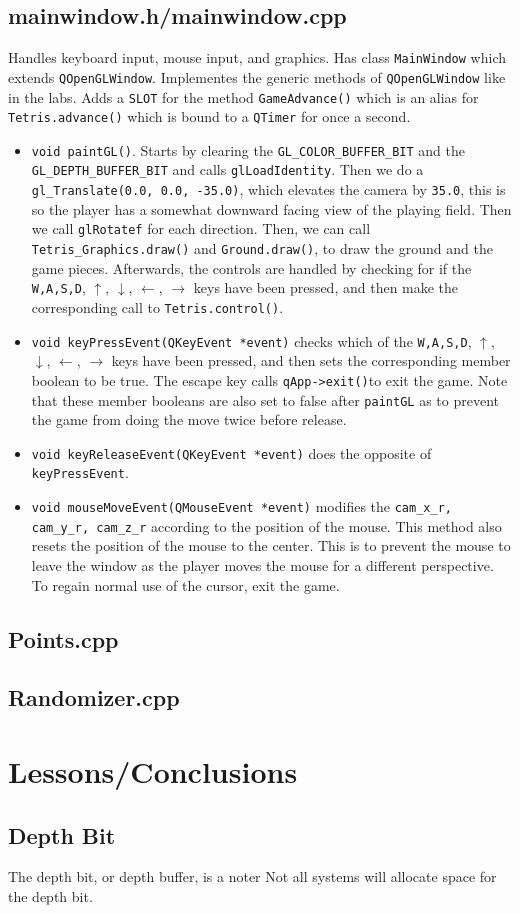 \documentclass[letterpaper, 12pt]{article}
\begin{document}
\subsection{mainwindow.h/mainwindow.cpp}
Handles keyboard input, mouse input, and graphics.
Has class \verb|MainWindow| which extends \verb|QOpenGLWindow|.
Implementes the generic methods of \verb|QOpenGLWindow| like in the labs.
Adds a \verb|SLOT| for the method \verb|GameAdvance()| which is an alias for \verb|Tetris.advance()| which is bound to a \verb|QTimer| for once a second.
\begin{itemize}
    \item \verb|void paintGL()|.
        Starts by clearing the \verb|GL_COLOR_BUFFER_BIT| and the \verb|GL_DEPTH_BUFFER_BIT| and calls \verb|glLoadIdentity|.
        Then we do a \verb|gl_Translate(0.0, 0.0, -35.0)|, which elevates the camera by \verb|35.0|, this is so the player has a somewhat downward facing view of the playing field.
        Then we call \verb|glRotatef| for each direction.
        Then, we can call \verb|Tetris_Graphics.draw()| and \verb|Ground.draw()|, to draw the ground and the game pieces.
        Afterwards, the controls are handled by checking for if the \verb|W,A,S,D|, $\uparrow$, $\downarrow$, $\leftarrow$, $\rightarrow$ keys have been pressed, and then make the corresponding call to \verb|Tetris.control()|.
    \item \verb|void keyPressEvent(QKeyEvent *event)| checks which of the \verb|W,A,S,D|, $\uparrow$, $\downarrow$, $\leftarrow$, $\rightarrow$ keys have been pressed, and then sets the corresponding member boolean to be true.
        The escape key calls \verb|qApp->exit()|to exit the game.
        Note that these member booleans are also set to false after \verb|paintGL| as to prevent the game from doing the move twice before release.
    \item \verb|void keyReleaseEvent(QKeyEvent *event)| does the opposite of \verb|keyPressEvent|.
    \item \verb|void mouseMoveEvent(QMouseEvent *event)| modifies the \verb|cam_x_r, cam_y_r, cam_z_r| according to the position of the mouse.
        This method also resets the position of the mouse to the center.
        This is to prevent the mouse to leave the window as the player moves the mouse for a different perspective.
        To regain normal use of the cursor, exit the game.
\end{itemize}
\subsection{Points.cpp}
\subsection{Randomizer.cpp}
\section{Lessons/Conclusions}
\subsection{Depth Bit}
The depth bit, or depth buffer, is a noter
Not all systems will allocate space for the depth bit.
\end{document}

